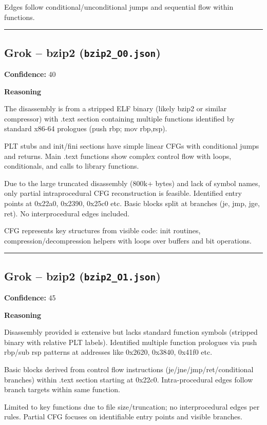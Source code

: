 Edges follow conditional/unconditional jumps and sequential flow within functions.

\bigskip
\hrule
\bigskip

\subsection{Grok -- bzip2 (\texttt{bzip2\_O0.json})}

\textbf{Confidence:} 40

\textbf{Reasoning}

The disassembly is from a stripped ELF binary (likely bzip2 or similar compressor) with .text section containing multiple functions identified by standard x86-64 prologues (push rbp; mov rbp,rsp).

PLT stubs and init/fini sections have simple linear CFGs with conditional jumps and returns. Main .text functions show complex control flow with loops, conditionals, and calls to library functions.

Due to the large truncated disassembly (800k+ bytes) and lack of symbol names, only partial intraprocedural CFG reconstruction is feasible. Identified entry points at 0x22a0, 0x2390, 0x25c0 etc. Basic blocks split at branches (je, jmp, jge, ret). No interprocedural edges included.

CFG represents key structures from visible code: init routines, compression/decompression helpers with loops over buffers and bit operations.

\bigskip
\hrule
\bigskip

\subsection{Grok -- bzip2 (\texttt{bzip2\_O1.json})}

\textbf{Confidence:} 45

\textbf{Reasoning}

Disassembly provided is extensive but lacks standard function symbols (stripped binary with relative PLT labels). Identified multiple function prologues via push rbp/sub rsp patterns at addresses like 0x2620, 0x3840, 0x41f0 etc.

Basic blocks derived from control flow instructions (je/jne/jmp/ret/conditional branches) within .text section starting at 0x22c0. Intra-procedural edges follow branch targets within same function.

Limited to key functions due to file size/truncation; no interprocedural edges per rules. Partial CFG focuses on identifiable entry points and visible branches.

